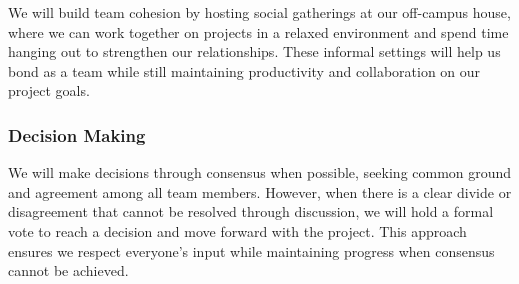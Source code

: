 \documentclass{article}
\begin{document}
We will build team cohesion by hosting social gatherings at our off-campus house, where we can work together on projects in a relaxed environment and spend time hanging out
to strengthen our relationships. These informal settings will help us bond as a team while still maintaining productivity and collaboration on our project goals.

\subsubsection*{Decision Making} 

We will make decisions through consensus when possible, seeking common ground and agreement among all team members. However, when there is a clear divide or disagreement that 
cannot be resolved through discussion, we will hold a formal vote to reach a decision and move forward with the project. This approach ensures we respect everyone's input while 
maintaining progress when consensus cannot be achieved.
\end{document}
